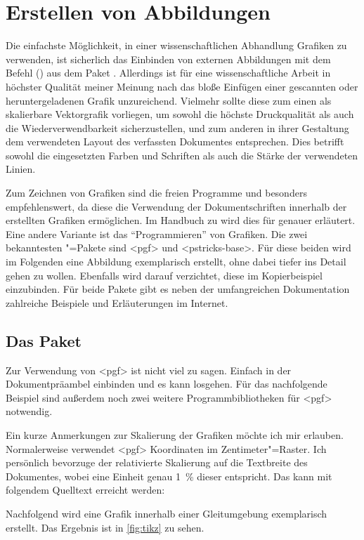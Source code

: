 \documentclass[%
  english,ngerman,%
  cdgeometry=no,DIV=12,automark%
]{tudscrartcl}
\begin{document}
\section{Erstellen von Abbildungen}
\label{sec:figures}%
%
Die einfachste Möglichkeit, in einer wissenschaftlichen Abhandlung Grafiken zu 
verwenden, ist sicherlich das Einbinden von externen Abbildungen mit dem Befehl 
() aus dem Paket . 
Allerdings ist für eine wissenschaftliche Arbeit in höchster Qualität meiner 
Meinung nach das bloße Einfügen einer gescannten oder heruntergeladenen Grafik 
unzureichend. Vielmehr sollte diese zum einen als skalierbare Vektorgrafik 
vorliegen, um sowohl die höchste Druckqualität als auch die 
Wiederverwendbarkeit sicherzustellen, und zum anderen in ihrer Gestaltung dem 
verwendeten Layout des verfassten Dokumentes entsprechen. Dies betrifft sowohl 
die eingesetzten Farben und Schriften als auch die Stärke der verwendeten 
Linien.

Zum Zeichnen von Grafiken sind die freien Programme  und 
besonders  empfehlenswert, da diese die Verwendung der 
Dokumentschriften innerhalb der erstellten Grafiken ermöglichen. Im Handbuch zu 
\TUDScript wird dies für  
genauer erläutert. Eine andere Variante ist das \enquote{Programmieren} von 
Grafiken. Die zwei bekanntesten "=Pakete sind <pgf> 
und <pstricks-base>. Für diese beiden wird im Folgenden eine 
Abbildung exemplarisch erstellt, ohne dabei tiefer ins Detail gehen zu wollen. 
Ebenfalls wird darauf verzichtet, diese im Kopierbeispiel einzubinden. Für 
beide Pakete gibt es neben der umfangreichen Dokumentation zahlreiche Beispiele 
und Erläuterungen im Internet.


\subsection{Das Paket }
Zur Verwendung von <pgf> ist nicht viel zu sagen. Einfach in der 
Dokumentpräambel einbinden und es kann losgehen. Für das nachfolgende Beispiel 
sind außerdem noch zwei weitere Programmbibliotheken für <pgf> 
notwendig.
%
\begin{Hint}
\usepackage{tikz}
\usetikzlibrary{chains}
\usetikzlibrary{decorations.markings}
\tikzset{on grid}
\end{Hint}
%
Ein kurze Anmerkungen zur Skalierung der Grafiken möchte ich mir erlauben. 
Normalerweise verwendet <pgf> Koordinaten im Zentimeter"=Raster. 
Ich persönlich bevorzuge der relativierte Skalierung auf die Textbreite des 
Dokumentes, wobei eine Einheit genau \SI{1}{\percent} dieser entspricht. Das 
kann mit folgendem Quelltext erreicht werden:
%
\CodeHook{\renewcommand\newlength[1]{}}
\begin{Hint*}
\newlength{\tikzunit}
\setlength{\tikzunit}{.01\textwidth}
\tikzset{x=\tikzunit,y=\tikzunit}
\end{Hint*}
%
Nachfolgend wird eine Grafik innerhalb einer Gleitumgebung exemplarisch 
erstellt. Das Ergebnis ist in \autoref{fig:tikz} zu sehen.
\end{document}

